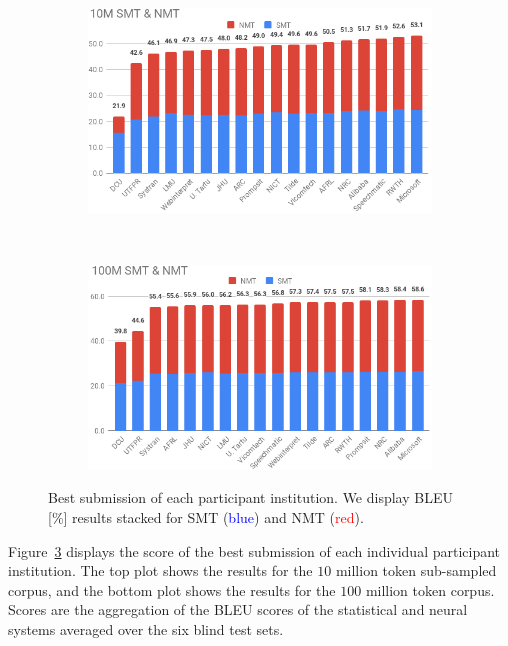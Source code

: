 \begin{figure}[ht]
  \centering
  \begin{subfigure}[b]{\columnwidth}
    \hspace*{-1.5em}
    \includegraphics[width=1.1\textwidth]{images/10M_crop.png}
    \label{fig:10M}
  \end{subfigure}
  ~
  \begin{subfigure}[b]{\columnwidth}
    \hspace*{-1.5em}
    \includegraphics[width=1.1\textwidth]{images/100M_crop.png}
    \label{fig:100M}
  \end{subfigure}
  \caption{Best submission of each participant institution. We display BLEU [\%] results stacked for SMT (\textcolor{blue}{blue}) and NMT (\textcolor{red}{red}).}
  \label{fig:results}
\end{figure}

Figure~\ref{fig:results} displays the score of the best submission of each individual participant institution. The top plot shows the results for the $10$ million token sub-sampled corpus, and the bottom plot shows the results for the $100$ million token corpus. Scores are the aggregation of the BLEU scores of the statistical and neural systems averaged over the six blind test sets.

